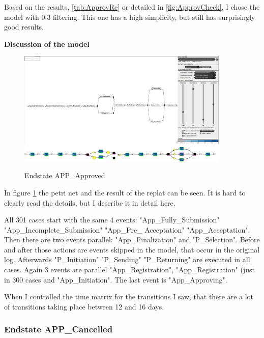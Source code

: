 Based on the results, \ref{tab:ApprovRe} or detailed in \ref{fig:ApprovCheck}, I chose the model with 0.3 filtering. This one has a high simplicity, but still has surprisingly good results.

\textbf{Discussion of the model}

\begin{figure}[!htbp]
\centering
\includegraphics[width =0.9\textwidth]{APP_ApprovedDFG0-3.PNG}  
\includegraphics[width =0.9\textwidth]{ApprovReplay.PNG}
\caption{Endstate APP\_Approved}
\label{fig:ApprovModel}
\end{figure}

In figure \ref{fig:ApprovModel} the petri net and the result of the replat can be seen. It is hard to clearly read the details, but I describe it in detail here. 

All 301 cases start with the same 4 events: "App\_Fully\_Submission" \textrightarrow "App\_Incomplete\_Submission" \textrightarrow "App\_Pre\_ Acceptation" \textrightarrow "App\_Acceptation". Then there are two events parallel: "App\_Finalization" and "P\_Selection". Before and after those actions are events skipped in the model, that occur in the original log. Afterwards "P\_Initiation" \textrightarrow "P\_Sending" \textrightarrow "P\_Returning" are executed in all cases. Again 3 events are parallel "App\_Registration", "App\_Registration" (just in 300 cases and "App\_Initiation". The last event is "App\_Approving".

When I controlled the time matrix for the transitions I saw, that there are a lot of transitions taking place between 12 and 16 days.

\subsubsection{Endstate APP\_Cancelled}



